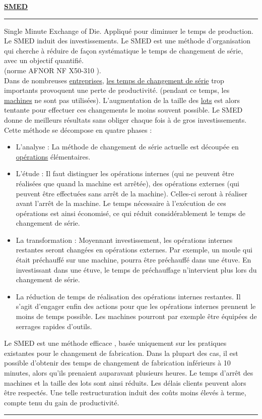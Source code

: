 \documentclass[12pt,a4paper,twoside]{article}
\newcommand{\definition}[3]{
	\begin{minipage}{\textwidth}
		\textbf{\large{#1}}\\
		\rule{\textwidth}{0.5pt}
		#2\\
		\ifthenelse{\isempty{#3}}%
	    {}%
	    {\rule{\textwidth}{0.25pt}\\\textit{#3}}%
    \end{minipage}
    \\\\
}
\begin{document}
\definition{\href{http://gpr.insa-lyon.fr/supgedem/Home/Le_monde_industriel/L_entreprise/Le_systeme_physique_de_production/le_SMED.htm}{SMED}}
{
	Single Minute Exchange of Die.
	Appliqué pour diminuer le temps de production.
	Le SMED induit des investissements.
	Le SMED est une méthode d'organisation qui cherche à réduire de façon systématique le temps de changement de série, avec un objectif quantifié.\\
	(norme AFNOR NF X50-310 ).\\
	Dans de nombreuses \href{http://gpr.insa-lyon.fr/supgedem/Home/Le_monde_industriel/L_entreprise/lentreprise.htm}{entreprises}, \href{http://gpr.insa-lyon.fr/supgedem/Home/glossaire/gLetempsdechangementdeserie.htm}{les temps de changement de série} trop importants provoquent une perte de productivité. (pendant ce temps, les \href{http://gpr.insa-lyon.fr/supgedem/Home/Le_monde_industriel/L_entreprise/Le_systeme_physique_de_production/machines.htm}{machines} ne sont pas utilisées). L'augmentation de la taille des \href{http://gpr.insa-lyon.fr/supgedem/Home/glossaire/gleslots.htm}{lots} est alors tentante pour effectuer ces changements le moins souvent possible. Le SMED donne de meilleurs résultats sans obliger chaque fois à de gros investissements.
	Cette méthode se décompose en quatre phases :
	\begin{itemize}
		\item L'analyse : La méthode de changement de série actuelle est découpée en \href{http://gpr.insa-lyon.fr/supgedem/Home/glossaire/glesoper.htm}{opérations} élémentaires.
		\item L'étude : Il faut distinguer les opérations internes (qui ne peuvent être réalisées que quand la machine est arrêtée), des opérations externes (qui peuvent être effectuées sans arrêt de la machine). Celles-ci seront à réaliser avant l'arrêt de la machine. Le temps nécessaire à l'exécution de ces opérations est ainsi économisé, ce qui réduit considérablement le temps de changement de série.
		\item La transformation : Moyennant investissement, les opérations internes restantes seront changées en opérations externes. Par exemple, un moule qui était préchauffé sur une machine, pourra être préchauffé dans une étuve. En investissant dans une étuve, le temps de préchauffage n'intervient plus lors du changement de série.
		\item La réduction de temps de réalisation des opérations internes restantes. Il s'agit d'engager enfin des actions pour que les opérations internes prennent le moins de temps possible. Les machines pourront par exemple être équipées de serrages rapides d'outils.
	\end{itemize}
	Le SMED est une méthode efficace , basée uniquement sur les pratiques existantes pour le changement de fabrication. Dans la plupart des cas, il est possible d'obtenir des temps de changement de fabrication inférieurs à 10 minutes, alors qu'ils prenaient auparavant plusieurs heures. Le temps d'arrêt des machines et la taille des lots sont ainsi réduits. Les délais clients peuvent alors être respectés. Une telle restructuration induit des coûts moins élevés à terme, compte tenu du gain de productivité.
	}{}
	
\end{document}
